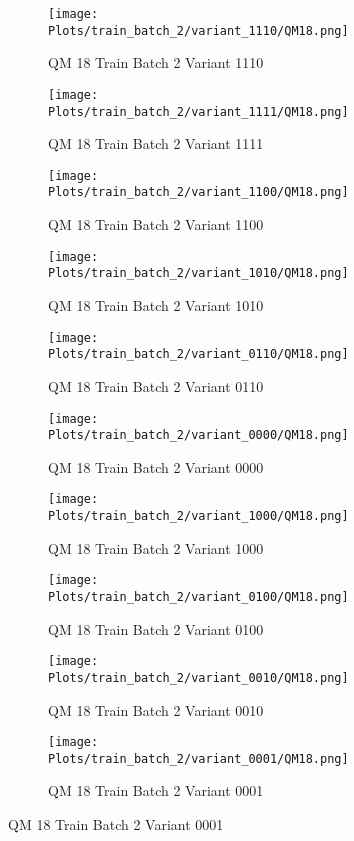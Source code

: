 \documentclass{DissertateFigs}
\begin{document}
\begin{figure}[t!]
    \begin{subfigure}{0.47\textwidth}
    \texttt{[image: Plots/train\_batch\_2/variant\_1110/QM18.png]}
    \caption{QM 18 Train Batch 2 Variant 1110}
    \end{subfigure}
    \begin{subfigure}{0.47\textwidth}
    \texttt{[image: Plots/train\_batch\_2/variant\_1111/QM18.png]}
    \caption{QM 18 Train Batch 2 Variant 1111}
    \end{subfigure}

\medskip

    \begin{subfigure}{0.47\textwidth}
    \texttt{[image: Plots/train\_batch\_2/variant\_1100/QM18.png]}
    \caption{QM 18 Train Batch 2 Variant 1100}
    \end{subfigure}
    \begin{subfigure}{0.47\textwidth}
    \texttt{[image: Plots/train\_batch\_2/variant\_1010/QM18.png]}
    \caption{QM 18 Train Batch 2 Variant 1010}
    \end{subfigure}

\medskip

    \begin{subfigure}{0.47\textwidth}
    \texttt{[image: Plots/train\_batch\_2/variant\_0110/QM18.png]}
    \caption{QM 18 Train Batch 2 Variant 0110}
    \end{subfigure}
    \begin{subfigure}{0.47\textwidth}
    \texttt{[image: Plots/train\_batch\_2/variant\_0000/QM18.png]}
    \caption{QM 18 Train Batch 2 Variant 0000}
    \end{subfigure}

\medskip

    \begin{subfigure}{0.47\textwidth}
    \texttt{[image: Plots/train\_batch\_2/variant\_1000/QM18.png]}
    \caption{QM 18 Train Batch 2 Variant 1000}
    \end{subfigure}
    \begin{subfigure}{0.47\textwidth}
    \texttt{[image: Plots/train\_batch\_2/variant\_0100/QM18.png]}
    \caption{QM 18 Train Batch 2 Variant 0100}
    \end{subfigure}

\medskip

    \begin{subfigure}{0.47\textwidth}
    \texttt{[image: Plots/train\_batch\_2/variant\_0010/QM18.png]}
    \caption{QM 18 Train Batch 2 Variant 0010}
    \end{subfigure}
    \begin{subfigure}{0.47\textwidth}
    \texttt{[image: Plots/train\_batch\_2/variant\_0001/QM18.png]}
    \caption{QM 18 Train Batch 2 Variant 0001}
    \end{subfigure}


\end{figure}
\end{document}
